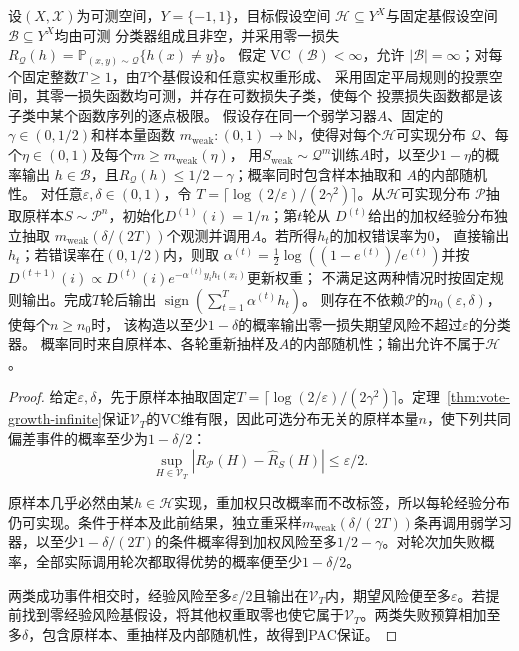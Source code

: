 \begin{theorem}[有限VC维基假设空间下的弱学习提升]
\label{thm:finite-class-boosting}
\label{thm:finite-vc-boosting}
设$(X,\mathcal X)$为可测空间，$Y=\{-1,1\}$，目标假设空间
$\mathcal H\subseteq Y^X$与固定基假设空间$\mathcal B\subseteq Y^X$均由可测
分类器组成且非空，并采用零一损失
$R_{\mathcal Q}(h)=\mathbb P_{(x,y)\sim\mathcal Q}\{h(x)\neq y\}$。
假定$\operatorname{VC}(\mathcal B)<\infty$，允许
$|\mathcal B|=\infty$；对每个固定整数$T\geq1$，由$T$个基假设和任意实权重形成、
采用固定平局规则的投票空间，其零一损失函数均可测，并存在可数损失子类，使每个
投票损失函数都是该子类中某个函数序列的逐点极限。
假设存在同一个弱学习器$A$、固定的$\gamma\in(0,1/2)$和样本量函数
$m_{\mathrm{weak}}:(0,1)\to\mathbb N$，使得对每个$\mathcal H$可实现分布
$\mathcal Q$、每个$\eta\in(0,1)$及每个$m\geq m_{\mathrm{weak}}(\eta)$，
用$S_{\mathrm{weak}}\sim\mathcal Q^m$训练$A$时，以至少$1-\eta$的概率输出
$h\in\mathcal B$，且$R_{\mathcal Q}(h)\leq1/2-\gamma$；概率同时包含样本抽取和
$A$的内部随机性。
对任意$\varepsilon,\delta\in(0,1)$，令
$T=\lceil\log(2/\varepsilon)/(2\gamma^2)\rceil$。从$\mathcal H$可实现分布
$\mathcal P$抽取原样本$S\sim\mathcal P^n$，初始化$D^{(1)}(i)=1/n$；第$t$轮从
$D^{(t)}$给出的加权经验分布独立抽取
$m_{\mathrm{weak}}(\delta/(2T))$个观测并调用$A$。若所得$h_t$的加权错误率为0，
直接输出$h_t$；若错误率在$(0,1/2)$内，则取
$\alpha^{(t)}=\tfrac12\log((1-e^{(t)})/e^{(t)})$并按
$D^{(t+1)}(i)\propto D^{(t)}(i)e^{-\alpha^{(t)}y_i h_t(x_i)}$更新权重；
不满足这两种情况时按固定规则输出。完成$T$轮后输出
$\operatorname{sign}(\sum_{t=1}^T\alpha^{(t)}h_t)$。
则存在不依赖$\mathcal P$的$n_0(\varepsilon,\delta)$，使每个$n\geq n_0$时，
该构造以至少$1-\delta$的概率输出零一损失期望风险不超过$\varepsilon$的分类器。
概率同时来自原样本、各轮重新抽样及$A$的内部随机性；输出允许不属于$\mathcal H$。
\end{theorem}

\begin{proof}
给定$\varepsilon,\delta$，先于原样本抽取固定$T=\lceil\log(2/\varepsilon)/(2\gamma^2)\rceil$。定理~\ref{thm:vote-growth-infinite}保证$\mathcal V_T$的VC维有限，因此可选分布无关的原样本量$n$，使下列共同偏差事件的概率至少为$1-\delta/2$：
\[
 \sup_{H\in\mathcal V_T}|R_{\mathcal P}(H)-\hat R_S(H)|\leq\varepsilon/2.
\]

原样本几乎必然由某$h\in\mathcal H$实现，重加权只改概率而不改标签，所以每轮经验分布仍可实现。条件于样本及此前结果，独立重采样$m_{\mathrm{weak}}(\delta/(2T))$条再调用弱学习器，以至少$1-\delta/(2T)$的条件概率得到加权风险至多$1/2-\gamma$。对轮次加失败概率，全部实际调用轮次都取得优势的概率便至少$1-\delta/2$。

两类成功事件相交时，经验风险至多$\varepsilon/2$且输出在$\mathcal V_T$内，期望风险便至多$\varepsilon$。若提前找到零经验风险基假设，将其他权重取零也使它属于$\mathcal V_T$。两类失败预算相加至多$\delta$，包含原样本、重抽样及内部随机性，故得到PAC保证。
\end{proof}

